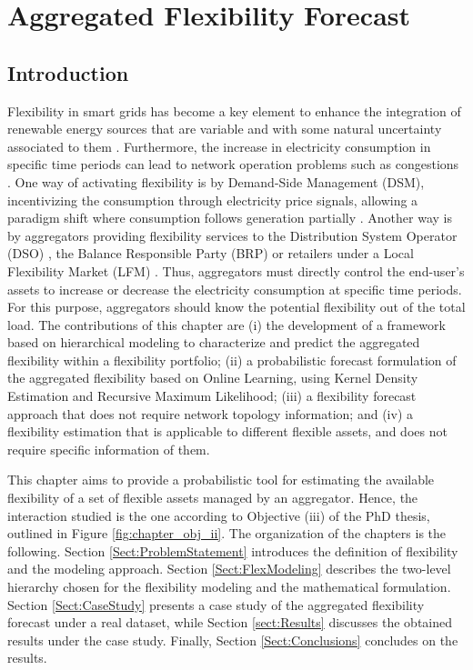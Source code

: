 \chapter{Aggregated Flexibility Forecast }
\label{ChapterAggFlexForecast}

\section{Introduction}
Flexibility in smart grids has become a key element to enhance the integration of renewable energy sources  that  are  variable and  with some  natural  uncertainty  associated  to  them \cite{Ulbig2015, Goutte2019}. Furthermore, the increase in electricity consumption in specific time periods can lead to network operation problems such as congestions \cite{CEDEC2018, LaurA.Nieto-MartinJ.BunnD.Vicente-Pastor2019}. One way of activating flexibility is by Demand-Side Management (DSM), incentivizing the consumption through electricity price signals, allowing a paradigm shift where consumption follows generation partially \cite{Strbac2008}. Another way is by aggregators providing flexibility services to the Distribution System Operator (DSO) \cite{MUNNE-COLLADO2019}, the Balance Responsible Party (BRP) or retailers under a Local Flexibility Market (LFM) \cite{Olivella-Rosell2018, Heinrich2020}. Thus, aggregators must directly control the end-user's assets to increase or decrease the electricity consumption at specific time periods. For this purpose, aggregators should know the potential flexibility out of the total load. 
The contributions of this chapter are (i) the development of a framework based on hierarchical modeling to characterize and predict the aggregated flexibility within a flexibility portfolio; (ii) a probabilistic forecast formulation of the aggregated flexibility based on Online Learning, using Kernel Density Estimation and Recursive Maximum Likelihood; (iii) a flexibility forecast approach that does not require network topology information; and (iv) a flexibility estimation that is applicable to different flexible assets, and does not require specific information of them. 

This chapter aims to provide a probabilistic tool for estimating the available flexibility of a set of flexible assets managed by an aggregator. Hence, the interaction studied is the one according to Objective (iii) of the PhD thesis, outlined in Figure \ref{fig:chapter_obj_ii}. The organization of the chapters is the following. Section \ref{Sect:ProblemStatement} introduces the definition of flexibility and the modeling approach. Section \ref{Sect:FlexModeling} describes the two-level hierarchy chosen for the flexibility modeling and the mathematical formulation. Section \ref{Sect:CaseStudy} presents a case study of the aggregated flexibility forecast under a real dataset, while Section \ref{sect:Results} discusses the obtained results under the case study. Finally, Section \ref{Sect:Conclusions} concludes on the results.


